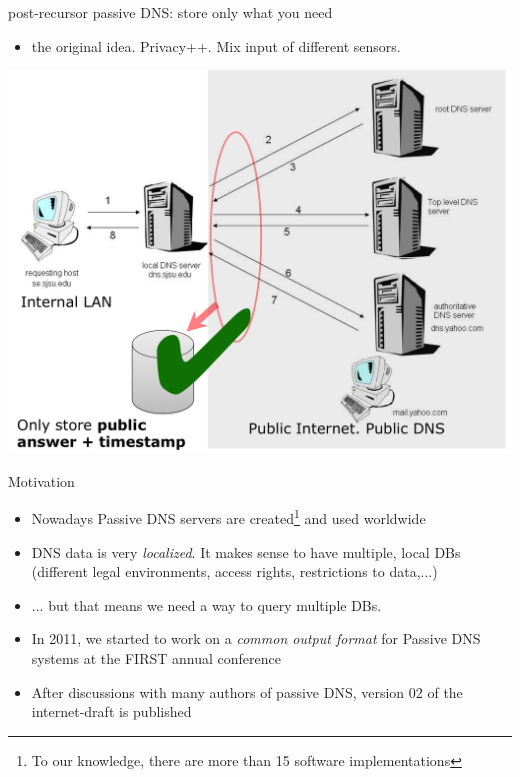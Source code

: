 \begin{frame}[t]{post-recursor passive DNS: store only what you need}
\begin{itemize}
\item the original idea. Privacy++. Mix input of different sensors.
\end{itemize}
\begin{centering}
  \vbox{}\vfill
  \includegraphics[scale=0.24]{post-recursor.png}
  \vfill
\end{centering}
\end{frame}

\begin{frame}[t]{Motivation}
\begin{itemize}
\item Nowadays Passive DNS servers are created\footnote{To our knowledge, there are more than 15 software implementations} and used worldwide
\item DNS data is very \emph{localized}. It makes sense to have multiple, local DBs (different legal environments, access rights, restrictions to data,...)
\item ... but that means we need a way to query multiple DBs.
\item In 2011, we started to work on a \emph{common output format} for Passive DNS systems at the FIRST annual conference
\item After discussions with many authors of passive DNS, version 02 of the internet-draft is published
\end{itemize}
\end{frame}



